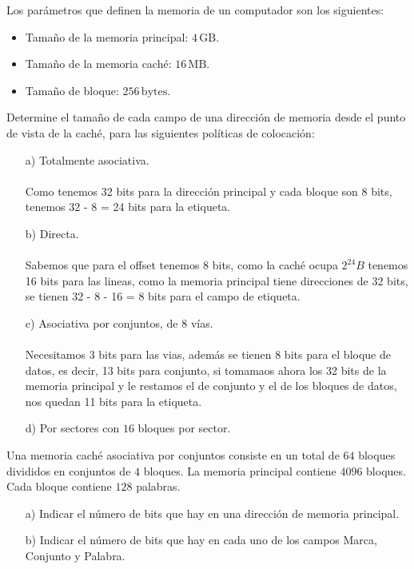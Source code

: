 \begin{ejercicio}
    Los parámetros que definen la memoria de un computador son los siguientes:
    \begin{itemize}
        \item Tamaño de la memoria principal: \(4 \, \text{GB}\).
        \item Tamaño de la memoria caché: \(16 \, \text{MB}\).
        \item Tamaño de bloque: \(256 \, \text{bytes}\).
    \end{itemize}
    Determine el tamaño de cada campo de una dirección de memoria desde el punto de vista de la caché, para las siguientes políticas de colocación:
    \begin{itemize}
        \item[a)] Totalmente asociativa.
            \\ \\
            Como tenemos 32 bits para la dirección principal y cada bloque son 8 bits, tenemos 32 - 8 = 24 bits para la etiqueta.
        \item[b)] Directa.
            \\ \\
            Sabemos que para el offset tenemos 8 bits, como la caché ocupa $2^{24}B$ tenemos 16 bits para las lineas, como la memoria principal tiene direcciones de 32 bits,
            se tienen 32 - 8 - 16 = 8 bits para el campo de etiqueta.
        \item[c)] Asociativa por conjuntos, de \(8\) vías.
            \\ \\
            Necesitamos 3 bits para las vias, además se tienen 8 bits para el bloque de datos, es decir, 13 bits para conjunto, si tomamaos ahora los 32 bits de la memoria principal y le restamos el de conjunto
            y el de los bloques de datos, nos quedan 11 bits para la etiqueta.
        \item[d)] Por sectores con \(16\) bloques por sector.
    \end{itemize}
\end{ejercicio}

\begin{ejercicio}
    Una memoria caché asociativa por conjuntos consiste en un total de \(64\) bloques divididos en conjuntos de \(4\) bloques. La memoria principal contiene \(4096\) bloques. Cada bloque contiene \(128\) palabras.
    \begin{itemize}
        \item[a)] Indicar el número de bits que hay en una dirección de memoria principal.
        \item[b)] Indicar el número de bits que hay en cada uno de los campos Marca, Conjunto y Palabra.
    \end{itemize}
\end{ejercicio}

